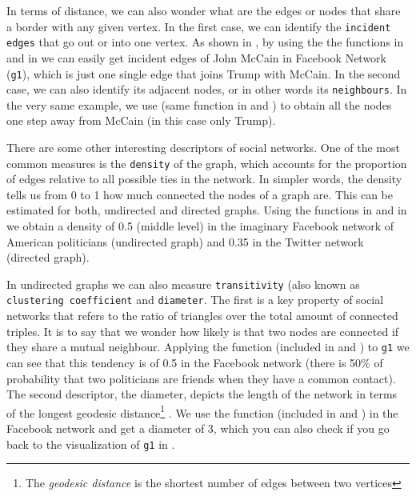 In terms of distance, we can also wonder what are the edges or nodes that share a border with any given vertex. In the first case, we can identify the \texttt{incident edges} that go out or into one vertex. As shown in , by using the the functions  in  and  in  we can easily get incident edges of John McCain in Facebook Network (\texttt{g1}), which is just one single edge that joins Trump with McCain. In the second case, we can also identify its adjacent nodes, or in other words its \texttt{neighbours}. In the very same example, we use  (same function in  and ) to obtain all the nodes one step away from McCain (in this case only Trump).


There are some other interesting descriptors of social networks. One of the most common measures is the \texttt{density} of the graph, which accounts for the proportion of edges relative to all possible ties in the network. In simpler words, the density tells us from 0 to 1 how much connected the nodes of a graph are. This can be estimated for both, undirected and directed graphs. Using the functions  in  and  in  we obtain a density of 0.5 (middle level) in the imaginary Facebook network of American politicians (undirected graph) and 0.35 in the Twitter network (directed graph). 

In undirected graphs we can also measure \texttt{transitivity} (also known as \texttt{clustering coefficient} and \texttt{diameter}. The first is a key property of social networks that refers to the ratio of triangles over the total amount of connected triples. It is to say that we wonder how likely is that two nodes are connected if they share a mutual neighbour. Applying the function  (included in  and ) to \texttt{g1} we can see that this tendency is of 0.5 in the Facebook network (there is 50\% of probability that two politicians 
are friends when they have a common contact). The second descriptor, the diameter, depicts the length of the network in terms of the longest geodesic distance\footnote{The \textit{geodesic distance} is the shortest number of edges between two vertices} . We use the function  (included in  and ) in the Facebook network and get a diameter of 3, which you can also check if you go back to the visualization of \texttt{g1} in . 

